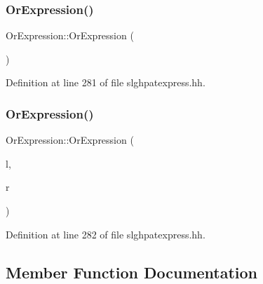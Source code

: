 \subsubsection{\texorpdfstring{OrExpression()}{OrExpression()}\hspace{0.1cm}{\footnotesize\ttfamily [1/2]}}
{\footnotesize\ttfamily Or\+Expression\+::\+Or\+Expression (\begin{DoxyParamCaption}\item[{void}]{ }\end{DoxyParamCaption})\hspace{0.3cm}{\ttfamily [inline]}}



Definition at line 281 of file slghpatexpress.\+hh.

\mbox{\label{class_or_expression_a43f637b66cbe898fb15f067c672aca25}} 
\subsubsection{\texorpdfstring{OrExpression()}{OrExpression()}\hspace{0.1cm}{\footnotesize\ttfamily [2/2]}}
{\footnotesize\ttfamily Or\+Expression\+::\+Or\+Expression (\begin{DoxyParamCaption}\item[{\mbox{\hyperlink{class_pattern_expression}{Pattern\+Expression}} $\ast$}]{l,  }\item[{\mbox{\hyperlink{class_pattern_expression}{Pattern\+Expression}} $\ast$}]{r }\end{DoxyParamCaption})\hspace{0.3cm}{\ttfamily [inline]}}



Definition at line 282 of file slghpatexpress.\+hh.



\subsection{Member Function Documentation}
\mbox{\label{class_or_expression_af7c1fe52ac78b97d8bf36d4fa94877fd}} 
